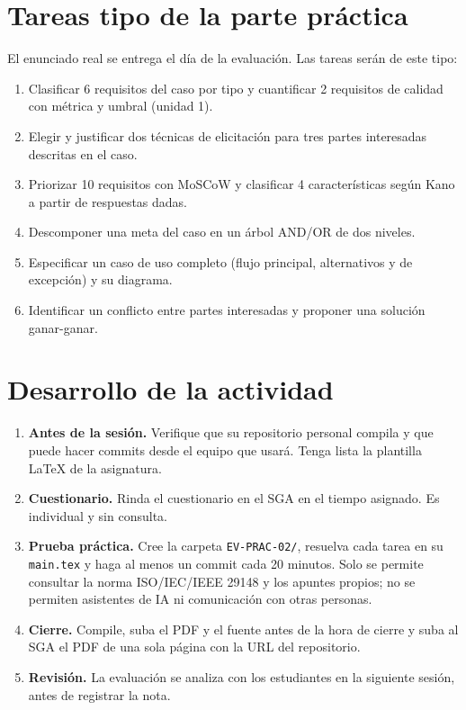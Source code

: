 \documentclass[11pt]{article}
\newcommand{\seccion}[1]{\section{\textcolor{utegreendk}{#1}}}
\begin{document}
\seccion{Tareas tipo de la parte práctica}

El enunciado real se entrega el día de la evaluación. Las tareas serán de este tipo:

\begin{enumerate}[leftmargin=20pt,itemsep=2pt]
	\item Clasificar 6 requisitos del caso por tipo y cuantificar 2 requisitos de calidad con métrica y umbral (unidad 1).
	\item Elegir y justificar dos técnicas de elicitación para tres partes interesadas descritas en el caso.
	\item Priorizar 10 requisitos con MoSCoW y clasificar 4 características según Kano a partir de respuestas dadas.
	\item Descomponer una meta del caso en un árbol AND/OR de dos niveles.
	\item Especificar un caso de uso completo (flujo principal, alternativos y de excepción) y su diagrama.
	\item Identificar un conflicto entre partes interesadas y proponer una solución ganar-ganar.
\end{enumerate}

\seccion{Desarrollo de la actividad}

\begin{enumerate}[leftmargin=20pt,itemsep=4pt]
	\item \textbf{Antes de la sesión.} Verifique que su repositorio personal compila y que puede hacer commits desde el equipo que usará. Tenga lista la plantilla \LaTeX{} de la asignatura.
	\item \textbf{Cuestionario.} Rinda el cuestionario en el SGA en el tiempo asignado. Es individual y sin consulta.
	\item \textbf{Prueba práctica.} Cree la carpeta \texttt{EV-PRAC-02/}, resuelva cada tarea en su \texttt{main.tex} y haga al menos un commit cada 20 minutos. Solo se permite consultar la norma ISO/\allowbreak{}IEC/\allowbreak{}IEEE 29148 y los apuntes propios; no se permiten asistentes de IA ni comunicación con otras personas.
	\item \textbf{Cierre.} Compile, suba el PDF y el fuente antes de la hora de cierre y suba al SGA el PDF de una sola página con la URL del repositorio.
	\item \textbf{Revisión.} La evaluación se analiza con los estudiantes en la siguiente sesión, antes de registrar la nota.
\end{enumerate}
\end{document}
